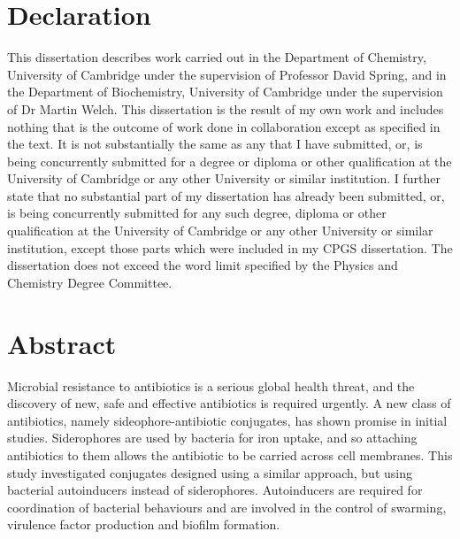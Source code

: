 \newpage

\section{Declaration}

This dissertation describes work carried out in the Department of Chemistry, University of Cambridge under the supervision of Professor David Spring, and in the Department of Biochemistry, University of Cambridge under the supervision of Dr Martin Welch. 
This dissertation is the result of my own work and includes nothing that is the outcome of work done in collaboration except as specified in the text. 
It is not substantially the same as any that I have submitted, or, is being concurrently submitted for a degree or diploma or other qualification at the University of Cambridge or any other University or similar institution. 
I further state that no substantial part of my dissertation has already been submitted, or, is being concurrently submitted for any such degree, diploma or other qualification at the University of Cambridge or any other University or similar institution, except those parts which were included in my CPGS dissertation.
The dissertation does not exceed the word limit specified by the Physics and Chemistry Degree Committee.








\vspace{5cm}





\newpage

\section{Abstract}

Microbial resistance to antibiotics is a serious global health threat, and the discovery of new, safe and effective antibiotics is required urgently. A new class of antibiotics, namely sideophore-antibiotic conjugates, has shown promise in initial studies. Siderophores are used by bacteria for iron uptake, and so attaching antibiotics to them allows the antibiotic to be carried across cell membranes. This study investigated conjugates designed using a similar approach, but using bacterial autoinducers instead of siderophores. Autoinducers are required for coordination of bacterial behaviours and are involved in the control of swarming, virulence factor production and biofilm formation. 

